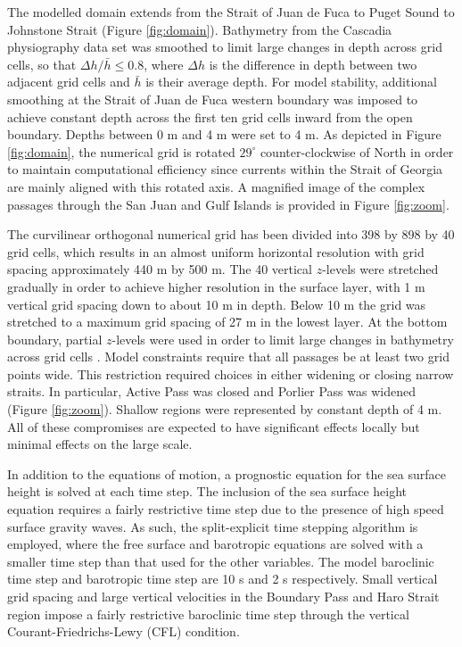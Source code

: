\documentclass[letterpaper]{tATO2e}
\begin{document}
The modelled domain extends from the Strait of Juan de Fuca to Puget Sound to Johnstone Strait (Figure \ref{fig:domain}). Bathymetry from the Cascadia physiography data set \citep{haugerud1999digital} was smoothed to limit large changes in depth across grid cells, so that $\Delta h/\bar{h} \leq 0.8$, where $\Delta h$ is the difference in depth between two adjacent grid cells and $\bar{h}$ is their average depth. For model stability, additional smoothing at the Strait of Juan de Fuca western boundary was imposed to achieve constant depth across the first ten grid cells {\color{red} inward from the open boundary. Depths between 0 m and 4 m were set to 4 m.}  As depicted in Figure \ref{fig:domain}, the numerical grid is rotated $29^{\circ}$ counter-clockwise of North in order to maintain computational efficiency since currents within the Strait of Georgia are mainly aligned with this rotated axis. {\color{red} A magnified image of the complex passages through the San Juan and Gulf Islands is provided in Figure \ref{fig:zoom}.}

The curvilinear orthogonal numerical grid has been divided into 398 by 898 by 40 grid cells, which results in an almost uniform horizontal resolution with grid spacing approximately 440 m by 500 m. The 40 vertical $z$-levels were stretched gradually in order to achieve higher resolution in the surface layer, with 1 m vertical grid spacing down to about 10 m in depth. Below 10 m the grid was stretched to a maximum grid spacing of 27 m in the lowest layer. At the bottom boundary, partial $z$-levels were used in order to limit large changes in bathymetry across grid cells \citep{madec2012nemo}. {\color{red} Model constraints require that all passages be at least two grid points wide.  This restriction required choices in either widening or closing narrow straits.  In particular, Active Pass was closed and Porlier Pass was widened (Figure \ref{fig:zoom}).  Shallow regions were represented by constant depth of 4 m.  All of these compromises are expected to have significant effects locally but minimal effects on the large scale.}

In addition to the equations of motion, a prognostic equation for the sea surface height is solved at each time step. The inclusion of the sea surface height equation requires a fairly restrictive time step due to the presence of high speed surface gravity waves. As such, the split-explicit time stepping algorithm is employed, where the free surface and barotropic equations are solved with a smaller time step than that used for the other variables. The model baroclinic time step and barotropic time step are 10 s and 2 s respectively. Small vertical grid spacing and large vertical velocities in the Boundary Pass and Haro Strait region impose a fairly restrictive baroclinic time step through the vertical Courant-Friedrichs-Lewy (CFL) condition.
\end{document}
